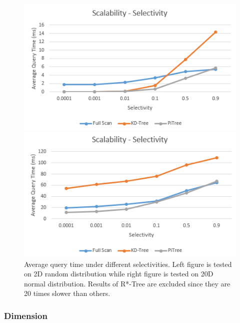 \documentclass[sigconf,10pt]{acmart}
\begin{document}
\begin{figure}[ht] 
  \label{scalability-selectivity} 
  \begin{minipage}[b]{0.45\linewidth}
    \centering
    \includegraphics[width=.8\linewidth]{../figures/scalability/selectivity-random} 
    \vspace{4ex}
  \end{minipage}%
  \begin{minipage}[b]{0.45\linewidth}
    \centering
    \includegraphics[width=.8\linewidth]{../figures/scalability/selectivity-normal} 
    \vspace{4ex}
  \end{minipage}%
  \caption{Average query time under different selectivities. Left figure is tested
  on 2D random distribution while right figure is tested on 20D normal distribution.
  Results of R*-Tree are excluded since they are 20 times slower than others.}
\end{figure}

\subsubsection{Dimension}
\end{document}
